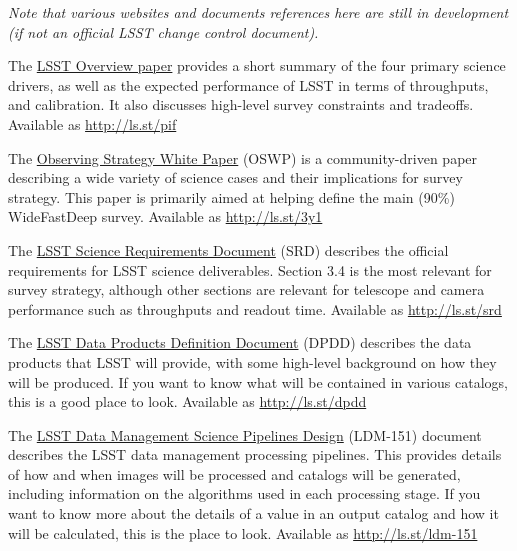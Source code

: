 \documentclass[DM,lsstdraft,toc,usenatbib]{lsstdoc}
\begin{document}
{\it Note that various websites and documents references here are still in development (if not an official LSST change control document).}

The \href{https://www.lsst.org/content/lsst-science-drivers-reference-design-and-anticipated-data-products}{LSST Overview paper} provides a short summary of the four primary science drivers, as well as the expected performance of LSST in terms of throughputs, and calibration. 
It also discusses high-level survey constraints and tradeoffs.  Available as \url{http://ls.st/pif}

The \href{https://github.com/LSSTScienceCollaborations/ObservingStrategy}{Observing Strategy White Paper}  (OSWP) is a community-driven paper describing a wide variety of science cases and their implications for survey strategy. This paper is primarily aimed at helping define the main (90\%) WideFastDeep survey. Available as \url{http://ls.st/3y1}

The \href{http:/ls.st/srd}{LSST Science Requirements Document} (SRD) describes the official requirements for LSST science deliverables. Section 3.4 is the most relevant for survey strategy, although other sections are relevant for telescope and camera performance such as throughputs and readout time. Available as \url{http://ls.st/srd}

The \href{http://ls.st/dpdd}{LSST Data Products Definition Document} (DPDD) describes the data products that LSST will provide, with some high-level background on how they will be produced. If you want to know what will be contained in various catalogs, this is a good place to look. Available as \url{http://ls.st/dpdd}

The \href{http://ls.st/ldm-151}{LSST Data Management Science Pipelines Design} (LDM-151) document describes the LSST data management processing pipelines. This provides details of how and when images will be processed and catalogs will be generated, including information on the algorithms used in each processing stage. If you want to know more about the details of a value in an output catalog and how it will be calculated, this is the place to look. Available as \url{http://ls.st/ldm-151}

\end{document}
